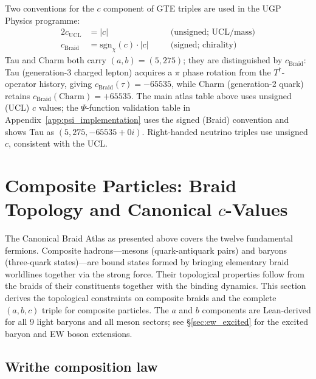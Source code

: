 \documentclass[11pt]{article}
\theoremstyle{remark}
\begin{document}
\begin{tcolorbox}[colback=gray!6!white,colframe=gray!55!black,
  title={\textbf{Convention note: $c$-sign / chirality}},
  left=5pt,right=5pt,top=4pt,bottom=4pt]
Two conventions for the $c$ component of GTE triples are used
in the UGP Physics programme:
\begin{alignat*}{2}
  c_{\mathrm{UCL}} &= |c|
  &\quad& \text{(unsigned; UCL/mass)} \\
  c_{\mathrm{Braid}} &= \mathrm{sgn}_\chi(c)\cdot|c|
  && \text{(signed; chirality)}
\end{alignat*}
Tau and Charm both carry $(a,b) = (5, 275)$; they are distinguished
by $c_{\mathrm{Braid}}$: Tau (generation-3 charged lepton) acquires a
$\pi$ phase rotation from the $T^\dag$-operator history, giving
$c_{\mathrm{Braid}}(\tau) = -65535$, while Charm (generation-2 quark)
retains $c_{\mathrm{Braid}}(\text{Charm}) = +65535$.
The main atlas table above uses unsigned (UCL) $c$ values; the
$\Psi$-function validation table in Appendix~\ref{app:psi_implementation}
uses the signed (Braid) convention and shows Tau as $(5,275,-65535{+}0i)$.
Right-handed neutrino triples use unsigned $c$, consistent with the UCL.
\end{tcolorbox}

\section{Composite Particles: Braid Topology and Canonical $c$-Values}
\label{sec:composites}

The Canonical Braid Atlas as presented above covers the twelve fundamental fermions.
Composite hadrons---mesons (quark-antiquark pairs) and baryons (three-quark states)---are
bound states formed by bringing elementary braid worldlines together via the strong force.
Their topological properties follow from the braids of their constituents together with
the binding dynamics.
This section derives the topological constraints on composite braids and
the complete $(a,b,c)$ triple for composite particles.
The $a$ and $b$ components are Lean-derived for all 9 light baryons
and all meson sectors; see \S\ref{sec:ew_excited} for the excited baryon
and EW boson extensions.

\subsection{Writhe composition law}
\label{subsec:composite_writhe}
\end{document}
